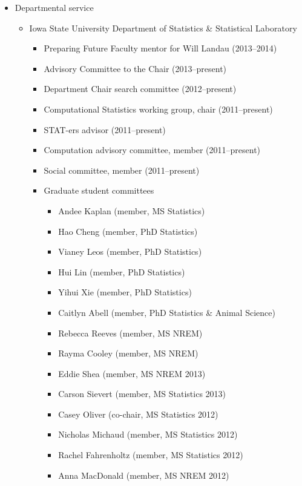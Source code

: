 \documentclass[overlapped,line,letterpaper]{res}
\begin{document}
\begin{resume}
\begin{itemize}
\item Departmental service
 	\begin{itemize}
	\item Iowa State University Department of Statistics \& Statistical Laboratory
		\begin{itemize}
		\item Preparing Future Faculty mentor for Will Landau (2013--2014)
		\item Advisory Committee to the Chair (2013--present)
		\item Department Chair search committee (2012--present)
		\item Computational Statistics working group, chair (2011--present)
		\item STAT-ers advisor (2011--present)
		\item Computation advisory committee, member (2011--present)
		\item Social committee, member (2011--present)

		\item Graduate student committees
			\begin{itemize}
				\item Andee Kaplan (member, MS Statistics)
				\item Hao Cheng (member, PhD Statistics)
				\item Vianey Leos (member, PhD Statistics)
				\item Hui Lin (member, PhD Statistics)
				\item Yihui Xie (member, PhD Statistics)
				\item Caitlyn Abell (member, PhD Statistics \& Animal Science)
				\item Rebecca Reeves (member, MS NREM)
				\item Rayma Cooley (member, MS NREM)
				
				\item Eddie Shea (member, MS NREM 2013)
				\item Carson Sievert (member, MS Statistics 2013)
				\item Casey Oliver (co-chair, MS Statistics 2012)
           		\item Nicholas Michaud (member, MS Statistics 2012)
           	 	\item Rachel Fahrenholtz (member, MS Statistics 2012)
				\item Anna MacDonald (member, MS NREM 2012)


\end{itemize}
\end{itemize}
\end{itemize}
\end{itemize}
\end{resume}
\end{document}
